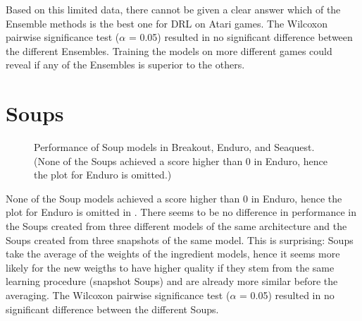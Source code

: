 Based on this limited data, there cannot be given a clear answer which of the Ensemble methods is the best one for DRL on Atari games. The Wilcoxon pairwise significance test ($\alpha$ = 0.05) resulted in no significant difference between the different Ensembles. Training the models on more different games could reveal if any of the Ensembles is superior to the others.


\section{Soups}
\begin{figure}[ht!]
    \centering

    \caption{Performance of Soup models in Breakout, Enduro, and Seaquest. (None of the Soups achieved a score higher than 0 in Enduro, hence the plot for Enduro is omitted.)}
    \label{fig:res:soups_only}
\end{figure}

None of the Soup models achieved a score higher than 0 in Enduro, hence the plot for Enduro is omitted in . There seems to be no difference in performance in the Soups created from three different models of the same architecture and the Soups created from three snapshots of the same model. This is surprising: Soups take the average of the weights of the ingredient models, hence it seems more likely for the new weigths to have higher quality if they stem from the same learning procedure (snapshot Soups) and are already more similar before the averaging. The Wilcoxon pairwise significance test ($\alpha$ = 0.05) resulted in no significant difference between the different Soups.


